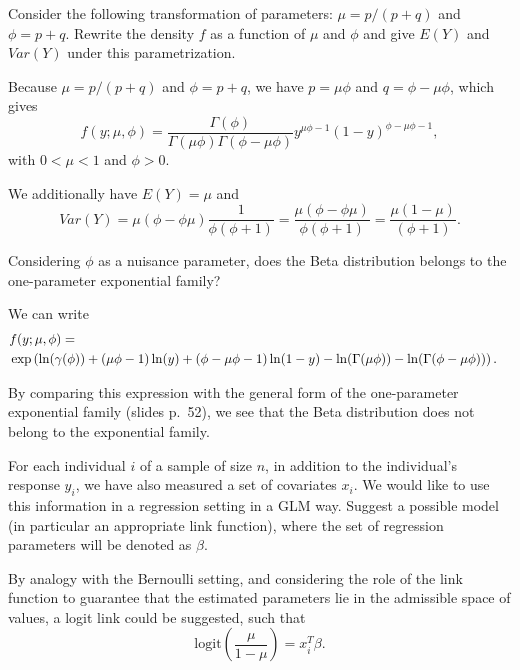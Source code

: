 \documentclass[11pt,a4paper%
addpoints, 
]{exam}
\begin{document}
\begin{questions}
\question[4] Consider the following transformation of parameters: $\mu = p/ (p+q)$ and
$\phi = p+q$. Rewrite the density $f$ as a function of $\mu$ and $\phi$ and give $E(Y)$ and $Var(Y)$ under this parametrization.

\begin{solution}
Because  $\mu = p/ (p+q)$ and $\phi = p+q$, we have $p = \mu \phi$ and $q = \phi - \mu \phi$, which gives
$$f(y; \mu, \phi) = \frac{\Gamma(\phi)}{\Gamma(\mu \phi) \Gamma ( \phi - \mu \phi)} y^{\mu \phi -1} (1-y)^{\phi - \mu \phi -1},$$
with $0<\mu<1$ and $\phi >0$.

We additionally have $E(Y) = \mu$ and 
$$Var(Y) = \mu(\phi - \phi \mu) \frac{1}{ \phi (\phi+1)} =  \frac{\mu(\phi - \phi \mu)}{\phi (\phi+1)} =  \frac{\mu(1 -  \mu)}{(\phi+1)}.$$

\end{solution}


\question[2]  Considering $\phi$ as a nuisance parameter, does the Beta distribution belongs to the one-parameter exponential family? 

\begin{solution}
We can write
\begin{eqnarray*}
\lefteqn{f(y; \mu, \phi) = }\\
& \exp \left( \ln(\gamma(\phi))  + (\mu \phi -1 ) \ln(y) + (\phi - \mu \phi -1) \ln(1-y) - \ln(\Gamma(\mu \phi)) - \ln(\Gamma(\phi - \mu \phi))  \right).
\end{eqnarray*}
 
By comparing this expression with the general form of the one-parameter exponential family (slides p.~52), we see that the Beta distribution does not belong to the exponential family.


\end{solution}


\question[2]  For each individual $i$ of a sample of size $n$, in addition to the
individual's response $y_i$, we have also measured a set of covariates $x_i$. We would like to use this information in a regression setting in a
GLM way. Suggest a possible model (in particular an appropriate link function), where the set of regression parameters will be denoted as $\beta$.

\begin{solution}

By analogy with the Bernoulli setting, and considering the role of the link function to guarantee that the estimated parameters lie in the admissible space of values, a logit link could be suggested, such that
$$\mbox{logit}\left( \frac{\mu}{1-\mu} \right) = x_i^T \beta.$$ 


\end{solution}
\end{questions}
\end{document}
